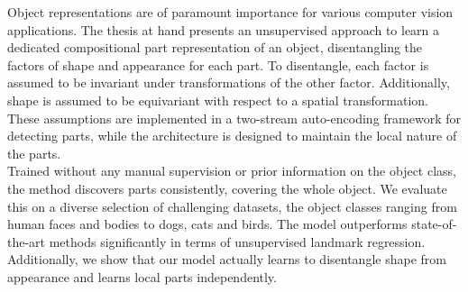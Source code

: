   Object representations are of paramount importance for various computer vision applications. %
  The thesis at hand presents an unsupervised approach to learn a dedicated compositional part representation of an object, disentangling the factors of shape and appearance for each part. %
  To disentangle, each factor is assumed to be invariant under transformations of the other factor. Additionally, shape is assumed to be equivariant with respect to a spatial transformation. These assumptions are implemented in a two-stream auto-encoding framework for detecting parts, while the architecture is designed to maintain the local nature of the parts.\\
  Trained without any manual supervision or prior information on the object class, the method discovers parts consistently, covering the whole object. We evaluate this on a diverse selection of challenging datasets, the object classes ranging from human faces and bodies to dogs, cats and birds.
  The model outperforms state-of-the-art methods significantly in terms of unsupervised landmark regression.
  Additionally, we show that our model actually learns to disentangle shape from appearance and learns local parts independently.



